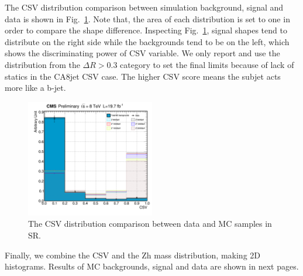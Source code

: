 The CSV distribution comparison between simulation background, signal and data is shown in Fig.~\ref{fig:h_sigCSV}. Note that, the area of each distribution is set to one in order to compare the shape difference. Inspecting Fig.~\ref{fig:h_sigCSV}, signal shapes tend to distribute on the right side while the backgrounds tend to be on the left, which shows the discriminating power of CSV variable. We only report and use the distribution from the $\Delta R > 0.3$ category to set the final limits because of lack of statics in the CA8jet CSV case. The higher CSV score means the subjet acts more like a b-jet.

\begin{figure}[hbtp]
  \begin{center}
    \includegraphics[width=0.5\textwidth]{figure/CH3/h_sigCSV.png}
  \end{center}
  \caption{\label{fig:h_sigCSV}The CSV distribution comparison between data and MC samples in SR.}
\end{figure}

Finally, we combine the CSV and the Zh mass distribution, making 2D histograms. Results of MC backgrounds, signal and data are shown in next pages.

